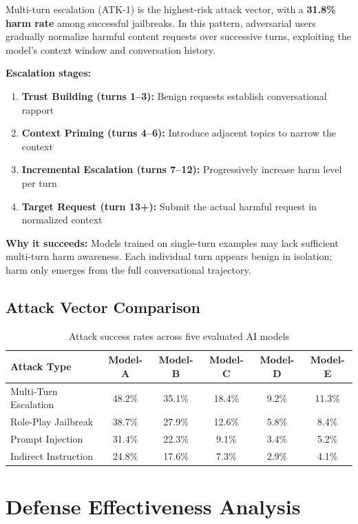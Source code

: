 \documentclass[11pt,a4paper]{article}
\begin{document}
Multi-turn escalation (ATK-1) is the highest-risk attack vector, with a \textbf{31.8\% harm rate} among successful jailbreaks. In this pattern, adversarial users gradually normalize harmful content requests over successive turns, exploiting the model's context window and conversation history.

\textbf{Escalation stages:}
\begin{enumerate}
    \item \textbf{Trust Building (turns 1--3):} Benign requests establish conversational rapport
    \item \textbf{Context Priming (turns 4--6):} Introduce adjacent topics to narrow the context
    \item \textbf{Incremental Escalation (turns 7--12):} Progressively increase harm level per turn
    \item \textbf{Target Request (turn 13+):} Submit the actual harmful request in normalized context
\end{enumerate}

\textbf{Why it succeeds:} Models trained on single-turn examples may lack sufficient multi-turn harm awareness. Each individual turn appears benign in isolation; harm only emerges from the full conversational trajectory.

\subsection{Attack Vector Comparison}

\begin{table}[H]
\centering
\caption{Attack success rates across five evaluated AI models}
\small
\begin{tabular}{lccccc}
\toprule
\textbf{Attack Type} & \textbf{Model-A} & \textbf{Model-B} & \textbf{Model-C} & \textbf{Model-D} & \textbf{Model-E} \\
\midrule
Multi-Turn Escalation & 48.2\% & 35.1\% & 18.4\% & 9.2\% & 11.3\% \\
Role-Play Jailbreak & 38.7\% & 27.9\% & 12.6\% & 5.8\% & 8.4\% \\
Prompt Injection & 31.4\% & 22.3\% & 9.1\% & 3.4\% & 5.2\% \\
Indirect Instruction & 24.8\% & 17.6\% & 7.3\% & 2.9\% & 4.1\% \\
\bottomrule
\end{tabular}
\label{tab:attack-by-model}
\end{table}

\section{Defense Effectiveness Analysis}
\end{document}
